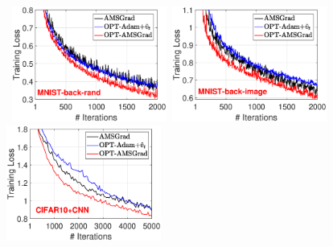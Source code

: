 \documentclass[wcp]{jmlr}
\begin{document}
\begin{figure}[t]
\centering
\mbox{\hspace{-0.2in}
\includegraphics[width=2.0in]{simulation/fig2/M_rand_train_loss_no1.eps}\hspace{-0.1in}
\includegraphics[width=2.0in]{simulation/fig2/M_image_train_loss_no1.eps}\hspace{-0.1in}
\includegraphics[width=2.0in]{simulation/fig2/cifar_cnn_train_loss_no1.eps}
}


\end{figure}
\end{document}
